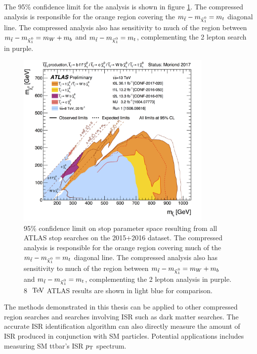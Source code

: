 \indent The 95\% confidence limit for the analysis is shown in figure \ref{figure.exclusion.All2016}.  The compressed analysis is responsible for the orange region covering the $m_{\stop}-m_{\ninoone} = m_t$ diagonal line.  The compressed analysis also has sensitivity to much of the region between $m_{\stop}-m_{\ninoone} = m_W + m_b$ and $m_{\stop}-m_{\ninoone} = m_t$, complementing the 2 lepton search in purple.  \\

\begin{figure}[htbp]
	\begin{center}
		\includegraphics[width=0.85\textwidth]{figures/8TeV/ATLAS_SUSY_Stop_tLSP.png}
		\caption{95\% confidence limit on stop parameter space resulting from all ATLAS stop searches on the 2015+2016 dataset.  The compressed analysis is responsible for the orange region covering much of the $m_{\stop}-m_{\ninoone} = m_t$ diagonal line.  The compressed analysis also has sensitivity to much of the region between $m_{\stop}-m_{\ninoone} = m_W + m_b$ and $m_{\stop}-m_{\ninoone} = m_t$, complementing the 2 lepton analysis in purple.  8 $\tev$ ATLAS results are shown in light blue for comparison.  }
		\label{figure.exclusion.All2016}
	\end{center}
\end{figure}

\indent The methods demonstrated in this thesis can be applied to other compressed region searches and searches involving ISR such as dark matter searches.  The accurate ISR identification algorithm can also directly measure the amount of ISR produced in conjunction with SM particles. Potential applications includes measuring SM ttbar's ISR $p_{\mathrm{T}}$ spectrum. \\

